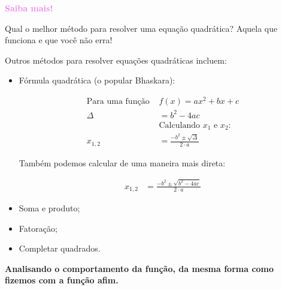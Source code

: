 \documentclass[12pt,openright,twoside,a4paper]{article}
\theoremstyle{definition}
\begin{document}
	\begin{snugshade}
		\textbf{\textcolor{violet}{Saiba mais!}}
		
		Qual o melhor método para resolver uma equação quadrática? Aquela que funciona e que você não erra!
		
		Outros métodos para resolver equações quadráticas incluem:
		
		\begin{itemize}
			\item Fórmula quadrática (o popular Bhaskara):
			
				\begin{align*}
					\text{Para uma função } & f(x) = ax^2 + bx + c\\
					\Delta &= b^2 - 4ac\\
					&\text{Calculando $x_1$ e $x_2$:}\\
					x_{1,2} &= \frac{- b^2 \pm \sqrt{\Delta}}{2 \cdot a}
				\end{align*}
				
				Também podemos calcular de uma maneira mais direta:
				
				\begin{align*}
					x_{1,2} &= \frac{- b^2 \pm \sqrt{b^2 - 4ac}}{2 \cdot a}
				\end{align*}
			
			\item Soma e produto;
			\item Fatoração;
			\item Completar quadrados.
		\end{itemize}
	\end{snugshade}
	
	\textbf{Analisando o comportamento da função, da mesma forma como fizemos com a função afim.}
	
\end{document}
